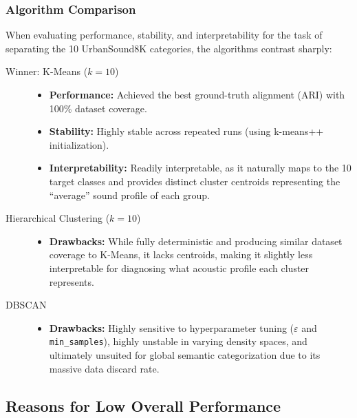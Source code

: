 \documentclass[runningheads,a4paper,11pt]{report}
\begin{document}
\subsubsection{Algorithm Comparison}

When evaluating performance, stability, and interpretability for the task of separating the 10 UrbanSound8K categories, the algorithms contrast sharply:

\begin{description}
    \item[Winner: K-Means ($k=10$)] \hfill
    \begin{itemize}
        \item \textbf{Performance:} Achieved the best ground-truth alignment (ARI) with 100\% dataset coverage.
        \item \textbf{Stability:} Highly stable across repeated runs (using k-means++ initialization).
        \item \textbf{Interpretability:} Readily interpretable, as it naturally maps to the 10 target classes and provides distinct cluster centroids representing the ``average'' sound profile of each group.
    \end{itemize}

    \item[Hierarchical Clustering ($k=10$)] \hfill
    \begin{itemize}
        \item \textbf{Drawbacks:} While fully deterministic and producing similar dataset coverage to K-Means, it lacks centroids, making it slightly less interpretable for diagnosing what acoustic profile each cluster represents.
    \end{itemize}

    \item[DBSCAN] \hfill
    \begin{itemize}
        \item \textbf{Drawbacks:} Highly sensitive to hyperparameter tuning ($\varepsilon$ and \texttt{min\_samples}), highly unstable in varying density spaces, and ultimately unsuited for global semantic categorization due to its massive data discard rate.
    \end{itemize}
\end{description}

\subsection{Reasons for Low Overall Performance}
\end{document}
